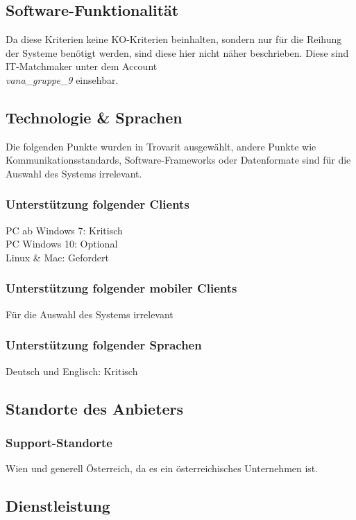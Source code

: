 \subsection{Software-Funktionalität}
Da diese Kriterien keine KO-Kriterien beinhalten, sondern nur für die Reihung der Systeme benötigt werden, sind diese hier nicht näher beschrieben. Diese sind IT-Matchmaker unter dem Account \\ \textit{vana\_gruppe\_9} einsehbar.

\subsection{Technologie \& Sprachen}
Die folgenden Punkte wurden in Trovarit ausgewählt, andere Punkte wie Kommunikationsstandards, Software-Frameworks oder Datenformate sind für die Auswahl des Systems irrelevant.
\subsubsection{Unterstützung folgender Clients}
PC ab Windows 7: Kritisch\\
PC Windows 10: Optional\\
Linux \& Mac: Gefordert
\subsubsection{Unterstützung folgender mobiler Clients}
Für die Auswahl des Systems irrelevant
\subsubsection{Unterstützung folgender Sprachen}
Deutsch und Englisch: Kritisch

\subsection{Standorte des Anbieters}
\subsubsection{Support-Standorte}
Wien und generell Österreich, da es ein österreichisches Unternehmen ist.
\subsection{Dienstleistung}
